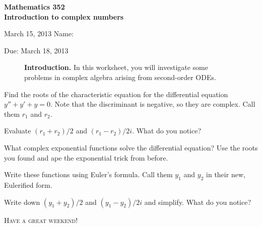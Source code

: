 \documentclass[11pt]{exam}
\begin{document}
\noindent
\textbf{{\large Mathematics 352 \\ Introduction to complex numbers}}

\noindent
March 15, 2013 \hfill Name: \underline{\hspace{3in}} 

\noindent
Due: March 18, 2013

\noindent
\begin{figure}[h]
\centering
\begin{minipage}[b]{0.85\linewidth}
\textbf{Introduction.} In this worksheet, you will investigate some problems in complex algebra arising from second-order ODEs.
\end{minipage}
\end{figure}
\begin{questions}  

\question Find the roots of the characteristic equation for the differential equation $y'' + y' + y = 0$. Note that the discriminant is negative, so they are complex. Call them $r_1$ and $r_2$.


\question Evaluate $(r_1 + r_2)/2$ and $(r_1 - r_2)/2i$. What do you notice?


\question What complex exponential functions solve the differential equation? Use the roots you found and ape the exponential trick from before.


\question Write these functions using Euler's formula. Call them $y_1$ and $y_2$ in their new, Eulerified form.


\question Write down $(y_1 + y_2)/2$ and $(y_1 - y_2)/2i$ and simplify. What do you notice?


\begin{center}
    {\large \textsc{Have a great weekend!}}
\end{center}

\end{questions}
\end{document}
